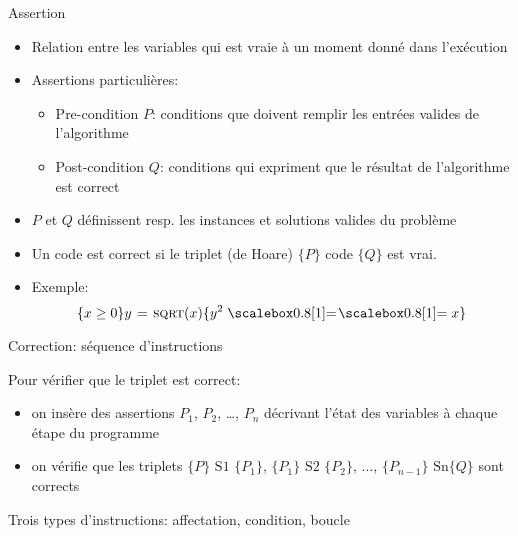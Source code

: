 \begin{frame}{Assertion}

\begin{itemize}
\item Relation entre les variables qui est vraie à un moment donné dans l'exécution
\item Assertions particulières:
\begin{itemize}
\item Pre-condition $P$: conditions que doivent remplir les entrées valides de l'algorithme
\item Post-condition $Q$: conditions qui expriment que le résultat de l'algorithme est correct
\end{itemize}
\item $P$ et $Q$ définissent resp. les instances et solutions valides du problème
\item Un code est correct si le triplet (de Hoare) $\{P\}$ code $\{Q\}$ est vrai.
\item Exemple:
$$\{x\geq 0\} y\gets \proc{sqrt}(x) \{y^2\isequal x\}$$
\end{itemize}

\end{frame}

\begin{frame}{Correction: séquence d'instructions}

\begin{center}\footnotesize
{}
\end{center}

Pour vérifier que le triplet est correct:
\begin{itemize}
\item on insère des assertions $P_1$, $P_2$, \ldots, $P_n$ décrivant
  l'état des variables à chaque étape du programme
\item on vérifie que les triplets $\{P\}\mbox{ S1 }\{P_1\}$,
  $\{P_1\}\mbox{ S2 }\{P_2\}$, $\ldots$, $\{P_{n-1}\} \mbox{ Sn
}\{Q\}$ sont corrects
\end{itemize}

\medskip

Trois types d'instructions: affectation, condition, boucle


\end{frame}

